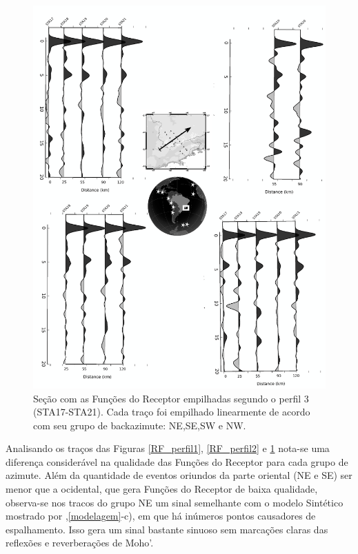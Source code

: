 \begin{figure}[!ht]
\centering
\includegraphics[scale=0.15]{Figs/RF_azimute_perfil3.png}
\caption{Seção com as Funções do Receptor empilhadas segundo o perfil 3 (STA17-STA21). Cada traço foi empilhado linearmente de acordo com seu grupo de backazimute: NE,SE,SW e NW.}
\label{RF_perfil3}
\end{figure}

Analisando os traços das Figuras \ref{RF_perfil1}, \ref{RF_perfil2} e \ref{RF_perfil3} nota-se uma diferença considerável na qualidade das Funções do Receptor para cada grupo de azimute. Além da quantidade de eventos oriundos da parte oriental (NE e SE) ser menor que a ocidental, que gera Funções do Receptor de baixa qualidade, observa-se nos tracos do grupo NE um sinal semelhante com o modelo Sintético mostrado por \cite{sand_franca_crustal_2004},\ref{modelagem}-c), em que há inúmeros pontos causadores de espalhamento. Isso gera um sinal bastante sinuoso sem marcações claras das reflexões e reverberações de Moho'.

